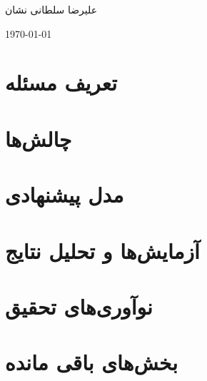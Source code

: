 \documentclass[20pt, a4paper]{article}
\begin{document}
\centerline{}
\centerline{علیرضا سلطانی نشان}
\centerline{\today}

\tableofcontents

\newpage

\section{تعریف مسئله}

\section{چالش‌ها}

\section{مدل پیشنهادی}

\section{آزمایش‌ها و تحلیل نتایج}

\section{نوآوری‌های تحقیق}

\section{بخش‌های باقی مانده}
\end{document}

